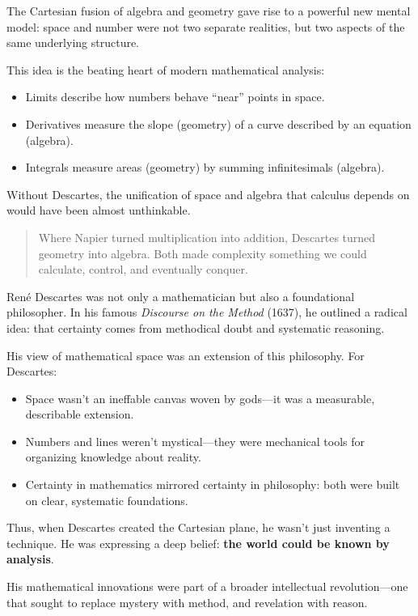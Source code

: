 The Cartesian fusion of algebra and geometry gave rise to a powerful new mental model:  
space and number were not two separate realities, but two aspects of the same underlying structure.

This idea is the beating heart of modern mathematical analysis:

\begin{itemize}
    \item Limits describe how numbers behave ``near'' points in space.
    \item Derivatives measure the slope (geometry) of a curve described by an equation (algebra).
    \item Integrals measure areas (geometry) by summing infinitesimals (algebra).
\end{itemize}

Without Descartes, the unification of space and algebra that calculus depends on would have been almost unthinkable.

\begin{quote}
Where Napier turned multiplication into addition,  
Descartes turned geometry into algebra.  
Both made complexity something we could calculate, control, and eventually conquer.
\end{quote}

\begin{tcolorbox}[colback=gray!5!white, colframe=black!80!white, title={Historical Sidebar: Descartes and the Philosophy of Mathematical Space}, fonttitle=\bfseries, arc=1.5mm, boxrule=0.4pt]
René Descartes was not only a mathematician but also a foundational philosopher. In his famous \textit{Discourse on the Method} (1637), he outlined a radical idea: that certainty comes from methodical doubt and systematic reasoning.

His view of mathematical space was an extension of this philosophy. For Descartes:

\begin{itemize}
    \item Space wasn’t an ineffable canvas woven by gods—it was a measurable, describable extension.
    \item Numbers and lines weren’t mystical—they were mechanical tools for organizing knowledge about reality.
    \item Certainty in mathematics mirrored certainty in philosophy: both were built on clear, systematic foundations.
\end{itemize}

Thus, when Descartes created the Cartesian plane, he wasn’t just inventing a technique.  
He was expressing a deep belief: \textbf{the world could be known by analysis}.

His mathematical innovations were part of a broader intellectual revolution—one that sought to replace mystery with method, and revelation with reason.
\end{tcolorbox}
